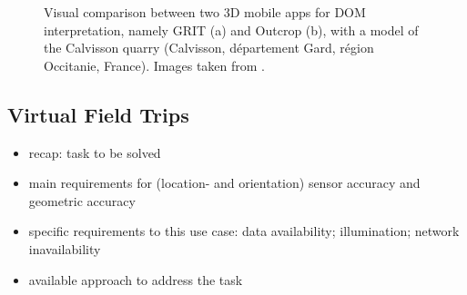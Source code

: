 \documentclass[review]{elsarticle}
\begin{document}
\begin{figure}[htbp]
\begin{center}
	 	\begin{minipage}{\columnwidth}
	 		\centering
	 	\end{minipage}
	\caption{Visual comparison between two 3D mobile apps for \gls{DOM} interpretation, namely \gls{GRIT} (a) and Outcrop (b), with a model of the Calvisson quarry (Calvisson, d\'{e}partement Gard, r\'{e}gion Occitanie, France). Images taken from \cite{Kehl2017_PhDThesis}.}
	\label{fig:field_geology}
\end{center}
\end{figure}

\subsection{Virtual Field Trips}
\label{sec:applications:virtual_field_trip}

\begin{itemize}
\item recap: task to be solved
\item main requirements for (location- and orientation) sensor accuracy and geometric accuracy
\item specific requirements to this use case: data availability; illumination; network inavailability
\item available approach to address the task
\end{itemize}

%
\end{document}
